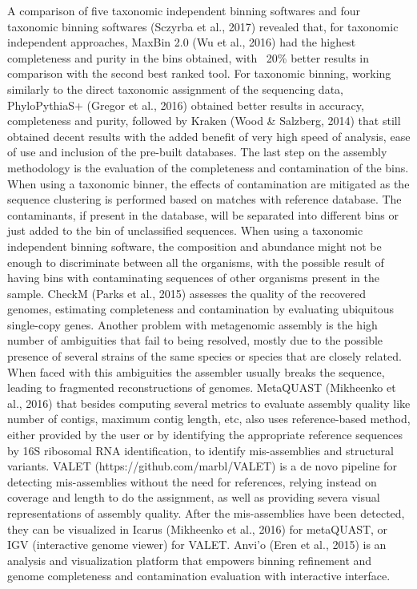 A comparison of five taxonomic independent binning softwares and four taxonomic binning softwares (Sczyrba et al., 2017) revealed that, for taxonomic independent approaches, MaxBin 2.0 (Wu et al., 2016) had the highest completeness and purity in the bins obtained, with ~20\% better results in comparison with the second best ranked tool. For taxonomic binning, working similarly to the direct taxonomic assignment of the sequencing data, PhyloPythiaS+ (Gregor et al., 2016) obtained better results in accuracy, completeness and purity, followed by Kraken (Wood & Salzberg, 2014) that still obtained decent results with the added benefit of very high speed of analysis, ease of use and inclusion of the pre-built databases.
The last step on the assembly methodology is the evaluation of the completeness and contamination of the bins. When using a taxonomic binner, the effects of contamination are mitigated as the sequence clustering is performed based on matches with reference database. The contaminants, if present in the database, will be separated into different bins or just added to the bin of unclassified sequences. When using a taxonomic independent binning software, the composition and abundance might not be enough to discriminate between all the organisms, with the possible result of having bins with contaminating sequences of other organisms present in the sample. CheckM (Parks et al., 2015) assesses the quality of the recovered genomes, estimating completeness and contamination by evaluating ubiquitous single-copy genes. 
Another problem with metagenomic assembly is the high number of ambiguities that fail to being resolved, mostly due to the possible presence of several strains of the same species or species that are closely related. When faced with this ambiguities the assembler usually breaks the sequence, leading to fragmented reconstructions of genomes. MetaQUAST (Mikheenko et al., 2016) that besides computing several metrics to evaluate assembly quality like number of contigs, maximum contig length, etc, also uses reference-based method, either provided by the user or by identifying the appropriate reference sequences by 16S ribosomal RNA identification, to identify mis-assemblies and structural variants. VALET (https://github.com/marbl/VALET) is a de novo pipeline for detecting mis-assemblies without the need for references, relying instead on coverage and length to do the assignment, as well as providing severa visual representations of assembly quality. After the mis-assemblies have been detected, they can be visualized in Icarus (Mikheenko et al., 2016) for metaQUAST, or IGV (interactive genome viewer) for VALET. Anvi’o (Eren et al., 2015) is an analysis and visualization platform that empowers binning refinement and genome completeness and contamination evaluation with interactive interface. 
